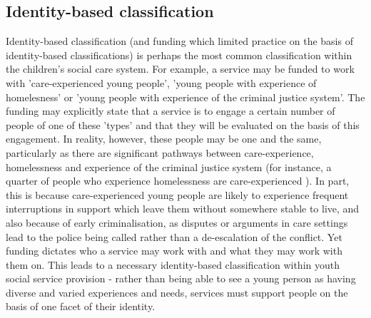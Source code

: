 \subsection{Identity-based classification}
\label{subsec:6-6-1-identity}
Identity-based classification (and funding which limited practice on the basis of identity-based classifications) is perhaps the most common classification within the children's social care system. For example, a service may be funded to work with 'care-experienced young people', 'young people with experience of homelesness' or 'young people with experience of the criminal justice system'. The funding may explicitly state that a service is to engage a certain number of people of one of these 'types' and that they will be evaluated on the basis of this engagement. In reality, however, these people may be one and the same, particularly as there are significant pathways between care-experience, homelessness and experience of the criminal justice system (for instance, a quarter of people who experience homelessness are care-experienced \citep{mackie_nations_2014}). In part, this is because care-experienced young people are likely to experience frequent interruptions in support which leave them without somewhere stable to live, and also because of early criminalisation, as disputes or arguments in care settings lead to the police being called rather than a de-escalation of the conflict. Yet funding dictates who a service may work with and what they may work with them on. This leads to a necessary identity-based classification within youth social service provision - rather than being able to see a young person as having diverse and varied experiences and needs, services must support people on the basis of one facet of their identity.

